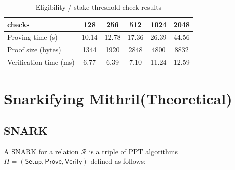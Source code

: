 \documentclass{article}
\begin{document}
\begin{table}[htbp]
  \centering
  \caption{Eligibility / stake-threshold check results}
  \renewcommand{\arraystretch}{0.9}
  \setlength{\tabcolsep}{10pt}
  \begin{tabular}{lccccc}
    \toprule
    \textbf{checks} & \textbf{128} & \textbf{256} & \textbf{512} & \textbf{1024} & \textbf{2048} \\
    \midrule
    Proving time (s)     & 10.14 & 12.78 & 17.36 & 26.39 & 44.56 \\
    Proof size (bytes)   & 1344  & 1920  & 2848  & 4800  & 8832 \\
    Verification time (ms) & 6.77  & 6.39  & 7.10  & 11.24 & 12.59 \\
    \bottomrule
  \end{tabular}
  \label{tab:eligibility_check_benchmark_en}
\end{table}






\newpage

\section{Snarkifying Mithril(Theoretical)}



\subsection{SNARK}
A SNARK for a relation $\mathcal{R}$ is a triple of PPT algorithms $\Pi = (\mathsf{Setup}, \mathsf{Prove}, \mathsf{Verify})$ defined as follows:
\end{document}
